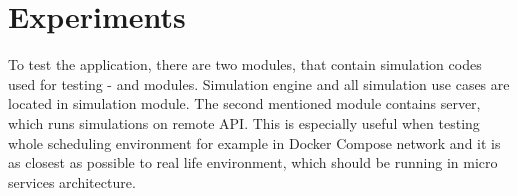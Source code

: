 \chapter{Experiments}\label{ch:experiments}

To test the application,
there are two modules, 
that contain simulation codes used for testing -
 and  modules.
Simulation engine and all simulation use cases are located in simulation module.
The second mentioned module contains server, 
which runs simulations on remote API. 
This is especially useful when testing whole scheduling environment for example in Docker Compose network
and it is as closest as possible to real life environment,
which should be running in micro services architecture.



